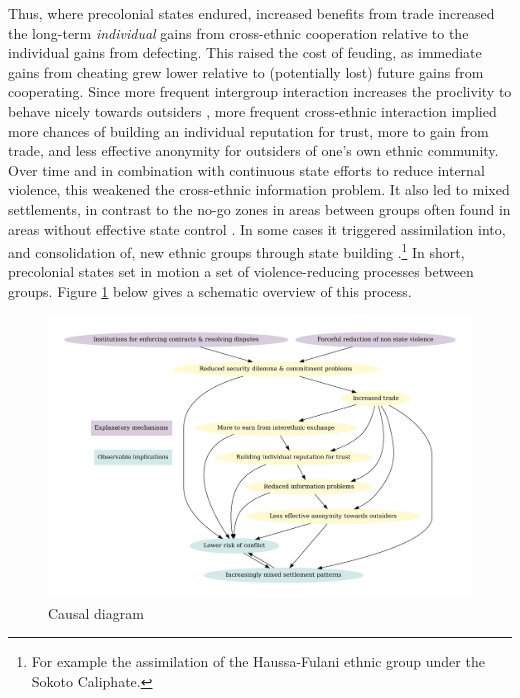 Thus, where precolonial states endured, increased benefits from trade increased
the long-term \textit{individual} gains from cross-ethnic cooperation relative
to the individual gains from defecting. This raised the cost of feuding, as
immediate gains from cheating grew lower relative to (potentially lost) future
gains from cooperating. Since more frequent intergroup interaction increases the
proclivity to behave nicely towards outsiders \citep[721]{Fearon_1996}, more
frequent cross-ethnic interaction implied more chances of building an individual
reputation for trust, more to gain from trade, and less effective anonymity for
outsiders of one’s own ethnic community. Over time and in combination with
continuous state efforts to reduce internal violence, this weakened the
cross-ethnic information problem. It also led to mixed settlements, in contrast
to the no-go zones in areas between groups often found in areas without
effective state control \citep{diamond2013world}.%
In some cases it
triggered assimilation into, and consolidation of, new ethnic groups through
state building \citep{Anderson2006}.\footnote{For example the assimilation of
the Haussa-Fulani ethnic group under the Sokoto Caliphate.} In short,
precolonial states set in motion a set of violence-reducing processes between
groups. Figure \ref{causal} below gives a schematic overview of this process.

\begin{figure}[hbtp]
	\centering
	\includegraphics[width=1\linewidth]{img/OMTcausal.pdf}
	\caption{Causal diagram}
	\label{causal}
\end{figure}


